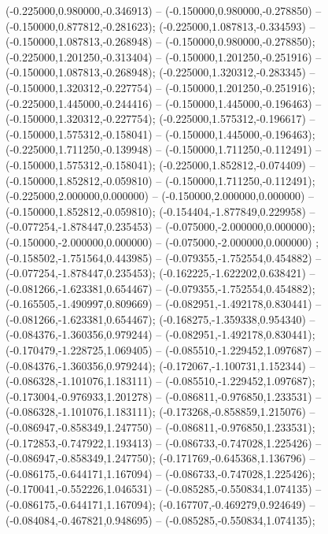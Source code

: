  (-0.225000,0.980000,-0.346913) -- (-0.150000,0.980000,-0.278850) -- (-0.150000,0.877812,-0.281623);
 (-0.225000,1.087813,-0.334593) -- (-0.150000,1.087813,-0.268948) -- (-0.150000,0.980000,-0.278850);
 (-0.225000,1.201250,-0.313404) -- (-0.150000,1.201250,-0.251916) -- (-0.150000,1.087813,-0.268948);
 (-0.225000,1.320312,-0.283345) -- (-0.150000,1.320312,-0.227754) -- (-0.150000,1.201250,-0.251916);
 (-0.225000,1.445000,-0.244416) -- (-0.150000,1.445000,-0.196463) -- (-0.150000,1.320312,-0.227754);
 (-0.225000,1.575312,-0.196617) -- (-0.150000,1.575312,-0.158041) -- (-0.150000,1.445000,-0.196463);
 (-0.225000,1.711250,-0.139948) -- (-0.150000,1.711250,-0.112491) -- (-0.150000,1.575312,-0.158041);
 (-0.225000,1.852812,-0.074409) -- (-0.150000,1.852812,-0.059810) -- (-0.150000,1.711250,-0.112491);
 (-0.225000,2.000000,0.000000) -- (-0.150000,2.000000,0.000000) -- (-0.150000,1.852812,-0.059810);
 (-0.154404,-1.877849,0.229958) -- (-0.077254,-1.878447,0.235453) -- (-0.075000,-2.000000,0.000000);
 (-0.150000,-2.000000,0.000000) -- (-0.075000,-2.000000,0.000000) ;
 (-0.158502,-1.751564,0.443985) -- (-0.079355,-1.752554,0.454882) -- (-0.077254,-1.878447,0.235453);
 (-0.162225,-1.622202,0.638421) -- (-0.081266,-1.623381,0.654467) -- (-0.079355,-1.752554,0.454882);
 (-0.165505,-1.490997,0.809669) -- (-0.082951,-1.492178,0.830441) -- (-0.081266,-1.623381,0.654467);
 (-0.168275,-1.359338,0.954340) -- (-0.084376,-1.360356,0.979244) -- (-0.082951,-1.492178,0.830441);
 (-0.170479,-1.228725,1.069405) -- (-0.085510,-1.229452,1.097687) -- (-0.084376,-1.360356,0.979244);
 (-0.172067,-1.100731,1.152344) -- (-0.086328,-1.101076,1.183111) -- (-0.085510,-1.229452,1.097687);
 (-0.173004,-0.976933,1.201278) -- (-0.086811,-0.976850,1.233531) -- (-0.086328,-1.101076,1.183111);
 (-0.173268,-0.858859,1.215076) -- (-0.086947,-0.858349,1.247750) -- (-0.086811,-0.976850,1.233531);
 (-0.172853,-0.747922,1.193413) -- (-0.086733,-0.747028,1.225426) -- (-0.086947,-0.858349,1.247750);
 (-0.171769,-0.645368,1.136796) -- (-0.086175,-0.644171,1.167094) -- (-0.086733,-0.747028,1.225426);
 (-0.170041,-0.552226,1.046531) -- (-0.085285,-0.550834,1.074135) -- (-0.086175,-0.644171,1.167094);
 (-0.167707,-0.469279,0.924649) -- (-0.084084,-0.467821,0.948695) -- (-0.085285,-0.550834,1.074135);
